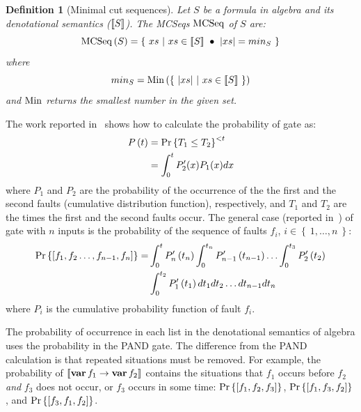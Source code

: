 \documentclass[12pt,openright,twoside,a4paper,oldfontcommands,english,brazil,final]{abntex2}
\newtheorem{definition}{Definition}[chapter]
\theoremstyle{theo}
\def\varop{\ensuremath\operatorname{\mathbf{var}}}
\newcommand{\var}[1]{\ensuremath\varop #1}
\def\xbeforeop{\ensuremath\rightarrow}
\newcommand{\xbefore}[2]{\ensuremath #1 \xbeforeop #2 }
\newcommand{\length}[1]{\ensuremath\left|#1\right|}
\def\listsetop{\ensuremath\operatorname{\mathbf{set}}}
\newcommand{\listset}[1]{\ensuremath\listsetop #1}
\def\probabilityop{\ensuremath \Pr}
\newcommand{\probability}[1]{\ensuremath \probabilityop\left\{#1\right\}}
\newcommand{\probabilityt}[1]{\ensuremath \probabilityop\left\{#1\right\}^{<t}}
\def\mcseqop{\ensuremath\operatorname{\mathrm{MCSeq}}}
\newcommand{\mcseq}[1]{\ensuremath\mcseqop\left(#1\right)}
\def\Minop{\ensuremath\mathrm{Min}}
\newcommand{\Min}[1]{\ensuremath\Minop\left(#1\right)}
\newcommand{\fiti}[1]{\ensuremath P'_{#1}\left(t_{#1}\right)}
\def\filterop{\ensuremath\mathrm{filter}}
\newcommand{\filter}[2]{\ensuremath\filterop_{#1}\left(#2\right)}
\newcommand{\denote}[1]{\ensuremath\left[\!\left[#1\right]\!\right]}
\def\permutationsop{\ensuremath\mathrm{permutations}}
\newcommand{\permutations}[1]{\ensuremath\permutationsop\left(#1\right)}
\newcommand{\listsof}[2]{\ensuremath\mathrm{lists}\left(#1, #2\right)}
\begin{document}
\begin{definition}[Minimal cut sequences]
Let $S$ be a formula in \ac{algebra} and its denotational semantics ($\denote{S}$). 
The \aclp{MCSeq} $\mcseqop$ of $S$ are:
%
\begin{equation}
\mcseq{S} = \left\{~ xs ~\middle|~ xs \in \denote{S} ~\bullet~ \length{xs} = min_S ~\right\}
\end{equation}
%
where
\[
min_S = \Min{\left\{~ \length{xs} ~\middle|~ xs \in \denote{S} ~\right\}}
\]
%
and $\Minop$ returns the smallest number in the given set.
\end{definition}

The work reported in~\cite{Merle2010} shows how to calculate the probability of  gate as:
%
\begin{align}
P\left(t\right) & = \probabilityt{T_1 \le T_2 }\nonumber\\
& = \int_0^t P'_2(x) P_1(x) dx\label{eq:pand-probability}
\end{align}
%
where $P_1$ and $P_2$ are the probability of the occurrence of the the first and the second faults (cumulative distribution function), respectively, and $T_1$ and $T_2$ are the times the first and the second faults occur.
The general case (reported in~\cite{FAR1976}) of  gate with $n$ inputs is the probability of the sequence of faults $f_i$, $i \in \left\{~1, \ldots, n~\right\}$:
%
\begin{align}
\probability{\left[f_1,f_2\ldots,f_{n-1},f_n\right]} = &\int_0^t\fiti{n}\int_0^{t_n}\fiti{n-1}\ldots\int_0^{t_3}\fiti{2}\nonumber\\
& \int_0^{t_2}\fiti{1} dt_1 dt_2\ldots dt_{n-1} dt_n\label{eq:general-pand-probability}
\end{align}
%
where $P_i$ is the cumulative probability function of fault $f_i$.

The probability of occurrence in each list in the denotational semantics of \ac{algebra} uses the probability in the \ac{PAND} gate.
The difference from the \ac{PAND} calculation is that repeated situations must be removed.
For example, the probability of $\denote{\xbefore{\var{f_1}}{\var{f_2}}}$ contains the situations that $f_1$ occurs before $f_2$ \emph{and} $f_3$ does not occur, or $f_3$ occurs in some time: $\probability{\left[f_1,f_2,f_3\right]}$, $\probability{\left[f_1,f_3,f_2\right]}$, and $\probability{\left[f_3,f_1,f_2\right]}$.
%
%
%
\end{document}
